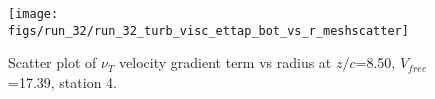 \begin{figure}[H]
\centering
\texttt{[image: figs/run\_32/run\_32\_turb\_visc\_ettap\_bot\_vs\_r\_meshscatter]}
\caption{Scatter plot of $\nu_T$ velocity gradient term vs radius at $z/c$=8.50, $V_{free}$=17.39, station 4.}
\label{fig:run_32_turb_visc_ettap_bot_vs_r_meshscatter}
\end{figure}


